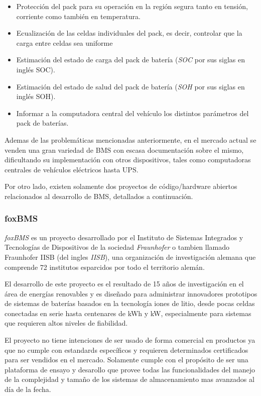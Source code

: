 \documentclass[10pt,a4paper]{article}
\begin{document}
\begin{itemize}
    \item Protección del pack para su operación en la región segura tanto 
        en tensión, corriente como también en temperatura.
    \item Ecualización de las celdas individuales del pack, es decir,
        controlar que la carga entre celdas sea uniforme
    \item Estimación del estado de carga del pack de batería 
        (\emph{\acrshort{SOC}} por sus siglas en ingl\'es \acrlong{SOC}).
    \item Estimación del estado de salud del pack de batería 
        (\emph{\acrshort{SOH}} por sus siglas en ingl\'es \acrlong{SOH}).
    \item Informar a la computadora central del vehículo los distintos 
        parámetros del pack de baterías.
\end{itemize}

\noindent Ademas de las problem\'aticas mencionadas anteriormente, en el mercado
actual se venden una gran variedad de \acrshort{BMS} con escasa documentaci\'on
sobre el mismo, dificultando su implementaci\'on con otros dispositivos, tales 
como computadoras centrales de veh\'iculos el\'ectricos hasta \acrshort{UPS}.

Por otro lado, existen solamente dos proyectos de c\'odigo/hardware abiertos
relacionados al desarrollo de \acrshort{BMS}, detallados a continuaci\'on.

\subsubsection{foxBMS}

\emph{foxBMS} \cite{foxbms} es un proyecto desarrollado por el Instituto de Sistemas
Integrados y Tecnolog\'ias de Dispositivos de la sociedad \emph{Fraunhofer} o
tambien llamado Fraunhofer IISB (del ingles \emph{\acrlong{IISB}}), una
organización de investigación alemana que comprende 72 institutos esparcidos por
todo el territorio alem\'an.

\noindent El desarrollo de este proyecto es el resultado de 15 años de
investigaci\'on en el \'area de energ\'ias renovables y es diseñado para 
administrar innovadores prototipos de sistemas de bater\'ias basados en la 
tecnolog\'ia iones de litio, desde pocas celdas conectadas en serie hasta 
centenares de kWh y kW, especialmente para sistemas que requieren altos niveles 
de fiabilidad.

\noindent El proyecto no tiene intenciones de ser usado de forma comercial en
productos ya que no cumple con estandards espec\'ificos y requieren determinados
certificados para ser vendidos en el mercado. Solamente cumple con el 
prop\'osito de ser una plataforma de ensayo y desarollo que provee todas las 
funcionalidades del manejo de la complejidad y tamaño de los sistemas de 
almacenamiento mas avanzados al d\'ia de la fecha.
\end{document}
